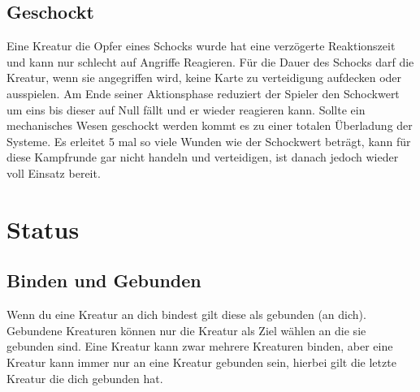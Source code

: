 \subsection*{Geschockt} \label{ef:geschockt}
Eine Kreatur die Opfer eines Schocks wurde hat eine verzögerte Reaktionszeit und kann nur schlecht auf Angriffe Reagieren. Für die Dauer des Schocks darf die Kreatur, wenn sie angegriffen wird, keine Karte zu verteidigung aufdecken oder ausspielen. Am Ende seiner Aktionsphase reduziert der Spieler den Schockwert um eins bis dieser auf Null fällt und er wieder reagieren kann. Sollte ein mechanisches Wesen geschockt werden kommt es zu einer totalen Überladung der Systeme. Es erleitet 5 mal so viele Wunden wie der Schockwert beträgt, kann für diese Kampfrunde gar nicht handeln und verteidigen, ist danach jedoch wieder voll Einsatz bereit. 


\section{Status}

\subsection*{Binden und Gebunden} \label{ef:binden_gebunden}
Wenn du eine Kreatur an dich bindest gilt diese als gebunden (an dich).     
Gebundene Kreaturen können nur die Kreatur als Ziel wählen an die sie gebunden sind. Eine Kreatur kann zwar mehrere Kreaturen binden, aber eine Kreatur kann immer nur an eine Kreatur gebunden sein, hierbei gilt die letzte Kreatur die dich gebunden hat.



